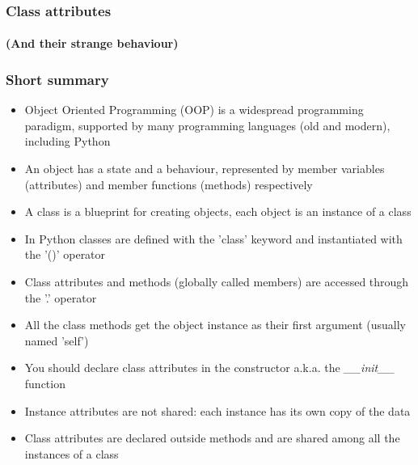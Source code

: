 \documentclass[9pt]{beamer}
\begin{document}
\begin{frame}
  \frametitle{Class attributes}
  \framesubtitle{(And their strange behaviour)}
  
\end{frame}


\begin{frame}
  \frametitle{Short summary}
  
  \begin{itemize}
    \footnotesize
    \item Object Oriented Programming (OOP) is a widespread programming paradigm,
          supported by many programming languages (old and modern), including Python
    \medskip
    \item An object has a state and a behaviour, represented by member variables (attributes)
          and member functions (methods) respectively
    \medskip
    \item A class is a blueprint for creating objects, each object is an instance of a class
    \medskip
    \item In Python classes are defined with the 'class' keyword and instantiated with the '()' operator
    \medskip
    \item Class attributes and methods (globally called members) are accessed through the '.' operator
    \medskip
    \item All the class methods get the object instance as their first argument (usually named 'self')
    \medskip
    \item You should declare class attributes in the constructor a.k.a. the \emph{\_\_init\_\_} function
    \medskip
    \item Instance attributes are not shared: each instance has its own copy of the data
    \medskip
    \item Class attributes are declared outside methods and are shared among all the instances of a class
  \end{itemize}
  
\end{frame}
\end{document}

